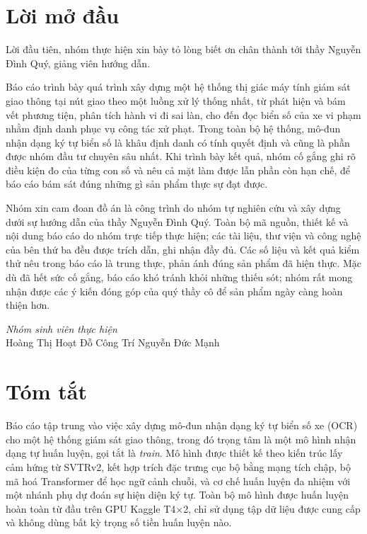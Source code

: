 \documentclass[12pt,a4paper]{report}
\begin{document}
\chapter*{Lời mở đầu}
\thispagestyle{plain}

Lời đầu tiên, nhóm thực hiện xin bày tỏ lòng biết ơn chân thành tới thầy Nguyễn Đình Quý, giảng viên hướng dẫn.

Báo cáo trình bày quá trình xây dựng một hệ thống thị giác máy tính giám sát giao thông tại nút giao theo một luồng xử lý thống nhất, từ phát hiện và bám vết phương tiện, phân tích hành vi đi sai làn, cho đến đọc biển số của xe vi phạm nhằm định danh phục vụ công tác xử phạt. Trong toàn bộ hệ thống, mô-đun nhận dạng ký tự biển số là khâu định danh có tính quyết định và cũng là phần được nhóm đầu tư chuyên sâu nhất. Khi trình bày kết quả, nhóm cố gắng ghi rõ điều kiện đo của từng con số và nêu cả mặt làm được lẫn phần còn hạn chế, để báo cáo bám sát đúng những gì sản phẩm thực sự đạt được.

Nhóm xin cam đoan đồ án là công trình do nhóm tự nghiên cứu và xây dựng dưới sự hướng dẫn của thầy Nguyễn Đình Quý. Toàn bộ mã nguồn, thiết kế và nội dung báo cáo do nhóm trực tiếp thực hiện; các tài liệu, thư viện và công nghệ của bên thứ ba đều được trích dẫn, ghi nhận đầy đủ. Các số liệu và kết quả kiểm thử nêu trong báo cáo là trung thực, phản ánh đúng sản phẩm đã hiện thực. Mặc dù đã hết sức cố gắng, báo cáo khó tránh khỏi những thiếu sót; nhóm rất mong nhận được các ý kiến đóng góp của quý thầy cô để sản phẩm ngày càng hoàn thiện hơn.

\vspace{1.2em}
\begin{flushright}
\textit{Nhóm sinh viên thực hiện}\\[3pt]
Hoàng Thị Hoạt \quad Đỗ Công Trí \quad Nguyễn Đức Mạnh
\end{flushright}

\chapter*{Tóm tắt}
\thispagestyle{plain}

Báo cáo tập trung vào việc xây dựng mô-đun nhận dạng ký tự biển số xe (OCR) cho một hệ thống giám sát giao thông, trong đó trọng tâm là một mô hình nhận dạng tự huấn luyện, gọi tắt là \emph{train}. Mô hình được thiết kế theo kiến trúc lấy cảm hứng từ SVTRv2, kết hợp trích đặc trưng cục bộ bằng mạng tích chập, bộ mã hoá Transformer để học ngữ cảnh chuỗi, và cơ chế huấn luyện đa nhiệm với một nhánh phụ dự đoán sự hiện diện ký tự. Toàn bộ mô hình được huấn luyện hoàn toàn từ đầu trên GPU Kaggle T4$\times$2, chỉ sử dụng tập dữ liệu được cung cấp và không dùng bất kỳ trọng số tiền huấn luyện nào.
\end{document}
